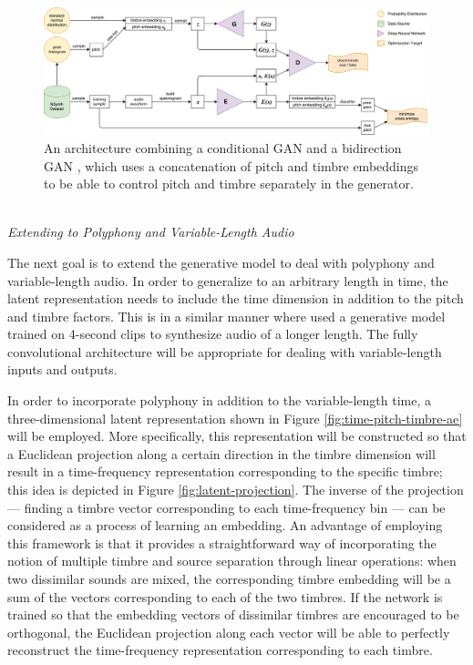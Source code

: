 \begin{figure}
	\includegraphics[width=\textwidth]{PEGAN.pdf}
	\caption{An architecture combining a conditional GAN \protect\cite{mirza2014conditional} and a bidirection GAN \protect\cite{donahue2016bigan}, which uses a concatenation of pitch and timbre embeddings to be able to control pitch and timbre separately in the generator.}
	\label{fig:pegan}
\end{figure}

\mbox{}\\\noindent\emph{Extending to Polyphony and Variable-Length Audio}\mbox{}

The next goal is to extend the generative model to deal with polyphony and variable-length audio.
In order to generalize to an arbitrary length in time, the latent representation needs to include the time dimension in addition to the pitch and timbre factors.
This is in a similar manner where  used a generative model trained on 4-second clips to synthesize audio of a longer length.
The fully convolutional architecture \cite{shelhamer2017fcn} will be appropriate for dealing with variable-length inputs and outputs.

In order to incorporate polyphony in addition to the variable-length time, a three-dimensional latent representation shown in Figure \ref{fig:time-pitch-timbre-ae} will be employed.
More specifically, this representation will be constructed so that a Euclidean projection along a certain direction in the timbre dimension will result in a time-frequency representation corresponding to the specific timbre;
this idea is depicted in Figure \ref{fig:latent-projection}.
The inverse of the projection --- finding a timbre vector corresponding to each time-frequency bin --- can be considered as a process of learning an embedding.
An advantage of employing this framework is that it provides a straightforward way of incorporating the notion of multiple timbre and source separation through linear operations: when two dissimilar sounds are mixed, the corresponding timbre embedding will be a sum of the vectors corresponding to each of the two timbres.
If the network is trained so that the embedding vectors of dissimilar timbres are encouraged to be orthogonal, the Euclidean projection along each vector will be able to perfectly reconstruct the time-frequency representation corresponding to each timbre.

